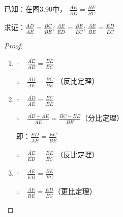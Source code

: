 \begin{example}
    已知：在图3.90中，
$\frac{\overline{AE}}{\overline{AD}}=\frac{\overline{BE}}{\overline{BC}}$

求证：$\frac{\overline{AD}}{\overline{AE}}=\frac{\overline{BC}}{\overline{BE}}$; $\frac{\overline{AE}}{\overline{ED}}=\frac{\overline{BE}}{\overline{EC}}$; $\frac{\overline{AE}}{\overline{BE}}=\frac{\overline{ED}}{\overline{EC}}$
\end{example}

\begin{figure}[htp]
    \centering
{}
    \caption{}
\end{figure}

\begin{proof}
\begin{enumerate}
    \item $\because\quad \frac{\overline{AE}}{\overline{AD}}=\frac{\overline{BE}}{\overline{BC}}$
    
    $\therefore\quad \frac{\overline{AD}}{\overline{AE}}=\frac{\overline{BC}}{\overline{BE}}$ （反比定理）

    \item $\because\quad \frac{\overline{AD}}{\overline{AE}}=\frac{\overline{BC}}{\overline{BE}}$
    
    $\therefore\quad \frac{\overline{AD}-\overline{AE}}{\overline{AE}}=\frac{\overline{BC}-\overline{BE}}{\overline{BE}}$（分比定理）

    即：$\frac{\overline{ED}}{\overline{AE}}=\frac{\overline{EC}}{\overline{BE}}$

    $\therefore\quad \frac{\overline{AE}}{\overline{ED}}=\frac{\overline{BE}}{\overline{EC}}$ （反比定理）

    \item $\because\quad \frac{\overline{AE}}{\overline{ED}}=\frac{\overline{BE}}{\overline{EC}}$
    
$\therefore\quad \frac{\overline{AE}}{\overline{BE}}=\frac{\overline{ED}}{\overline{EC}}$（更比定理）
\end{enumerate}
\end{proof}



